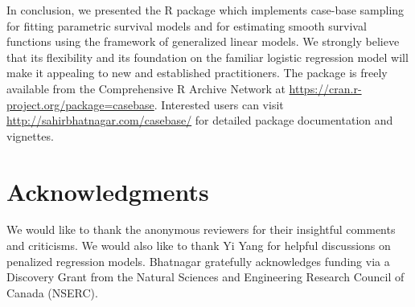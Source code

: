 In conclusion, we presented the R package  which
implements case-base sampling for fitting parametric survival models and
for estimating smooth survival functions using the framework of
generalized linear models. We strongly believe that its flexibility and
its foundation on the familiar logistic regression model will make it
appealing to new and established practitioners. The 
package is freely available from the Comprehensive R Archive Network at
\url{https://cran.r-project.org/package=casebase}. Interested users can
visit \url{http://sahirbhatnagar.com/casebase/} for detailed package
documentation and vignettes.

\hypertarget{acknowledgments}{%
\section{Acknowledgments}\label{acknowledgments}}

We would like to thank the anonymous reviewers for their insightful
comments and criticisms. We would also like to thank Yi Yang for helpful
discussions on penalized regression models. \mbox{Bhatnagar} gratefully
acknowledges funding via a Discovery Grant from the Natural Sciences and
Engineering Research Council of Canada (NSERC).



\address{%
Sahir Rai Bhatnagar*\\
McGill University\\%
1020 Pine Avenue West Montreal, QC, Canada H3A 1A2\\
%
\url{http://sahirbhatnagar.com/}\\%
%
%
}

\address{%
Maxime Turgeon*\\
University of Manitoba\\%
186 Dysart Road Winnipeg, MB, Canada R3T 2N2\\
%
\url{https://maxturgeon.ca/}\\%
%
%
}

\address{%
Jesse Islam\\
McGill University\\%
1020 Pine Avenue West Montreal, QC, Canada H3A 1A2\\
%
%
%
%
}

\address{%
James A. Hanley\\
McGill University\\%
1020 Pine Avenue West Montreal, QC, Canada H3A 1A2\\
%
\url{http://www.medicine.mcgill.ca/epidemiology/hanley/}\\%
%
%
}

\address{%
Olli Saarela\\
University of Toronto\\%
Dalla Lana School of Public Health, 155 College Street, 6th floor,
Toronto, Ontario M5T 3M7, Canada\\
%
\url{http://individual.utoronto.ca/osaarela/}\\%
%
%
}
